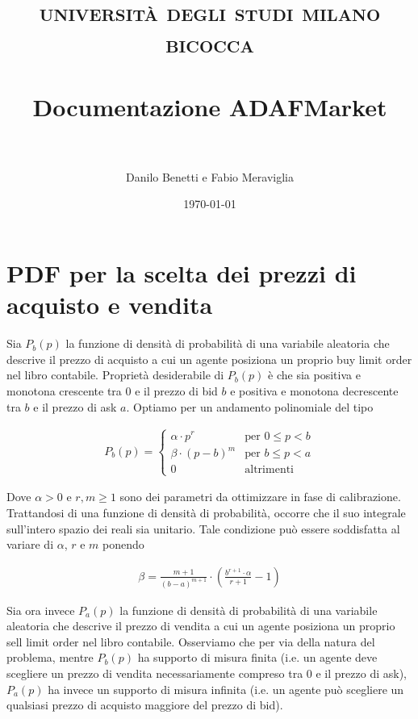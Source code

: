 \documentclass[paper=a4, fontsize=11pt]{scrartcl}
\title{	
\normalfont \normalsize 
\textsc{università degli studi milano bicocca} \\ [25pt]
\horrule{0.5pt} \\ [0.4cm]
\huge Documentazione ADAFMarket \\
\horrule{2pt} \\ [0.5cm]
}
\author{Danilo Benetti e Fabio Meraviglia} %
\date{\normalsize\today} %
\numberwithin{equation}{section}
\numberwithin{figure}{section}
\numberwithin{table}{section}
\begin{document}
\maketitle %


\section{PDF per la scelta dei prezzi di acquisto e vendita}

Sia $P_b(p)$ la funzione di densità di probabilità di una variabile aleatoria che descrive il prezzo di acquisto a cui un agente posiziona un proprio buy limit order nel libro contabile. Proprietà desiderabile di $P_b(p)$ è che sia positiva e monotona crescente tra $0$ e il prezzo di bid $b$ e positiva e monotona decrescente tra $b$ e il prezzo di ask $a$. Optiamo per un andamento polinomiale del tipo

\begin{align}
P_b(p) = \left\{\begin{array}{ll}
         \alpha \cdot p^r     & \text{per } 0 \leq p < b \\
         \beta  \cdot (p-b)^m & \text{per } b \leq p < a \\
         0                    & \text{altrimenti } \end{array}\right.
\end{align}

Dove $\alpha > 0$ e $r, m \geq 1$ sono dei parametri da ottimizzare in fase di calibrazione. Trattandosi di una funzione di densità di probabilità, occorre che il suo integrale sull'intero spazio dei reali sia unitario. Tale condizione può essere soddisfatta al variare di $\alpha$, $r$ e $m$ ponendo

\begin{align}
\beta = \frac{m+1}{(b-a)^{m+1}} \cdot \left(\frac{b^{r+1}\cdot\alpha}{r+1}-1\right)
\end{align}

Sia ora invece $P_a(p)$ la funzione di densità di probabilità di una variabile aleatoria che descrive il prezzo di vendita a cui un agente posiziona un proprio sell limit order nel libro contabile. Osserviamo che per via della natura del problema, mentre $P_b(p)$ ha supporto di misura finita (i.e. un agente deve scegliere un prezzo di vendita necessariamente compreso tra $0$ e il prezzo di ask), $P_a(p)$ ha invece un supporto di misura infinita (i.e. un agente può scegliere un qualsiasi prezzo di acquisto maggiore del prezzo di bid).\\
\end{document}
